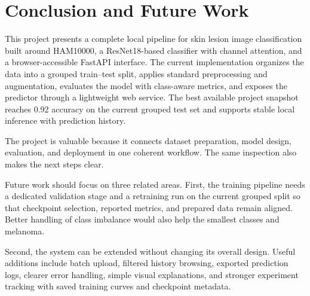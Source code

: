 \section{Conclusion and Future Work}

This project presents a complete local pipeline for skin lesion image classification built around HAM10000, a ResNet18-based classifier with channel attention, and a browser-accessible FastAPI interface. The current implementation organizes the data into a grouped train--test split, applies standard preprocessing and augmentation, evaluates the model with class-aware metrics, and exposes the predictor through a lightweight web service. The best available project snapshot reaches 0.92 accuracy on the current grouped test set and supports stable local inference with prediction history.

The project is valuable because it connects dataset preparation, model design, evaluation, and deployment in one coherent workflow. The same inspection also makes the next steps clear.

Future work should focus on three related areas. First, the training pipeline needs a dedicated validation stage and a retraining run on the current grouped split so that checkpoint selection, reported metrics, and prepared data remain aligned. Better handling of class imbalance would also help the smallest classes and melanoma.

Second, the system can be extended without changing its overall design. Useful additions include batch upload, filtered history browsing, exported prediction logs, clearer error handling, simple visual explanations, and stronger experiment tracking with saved training curves and checkpoint metadata.
